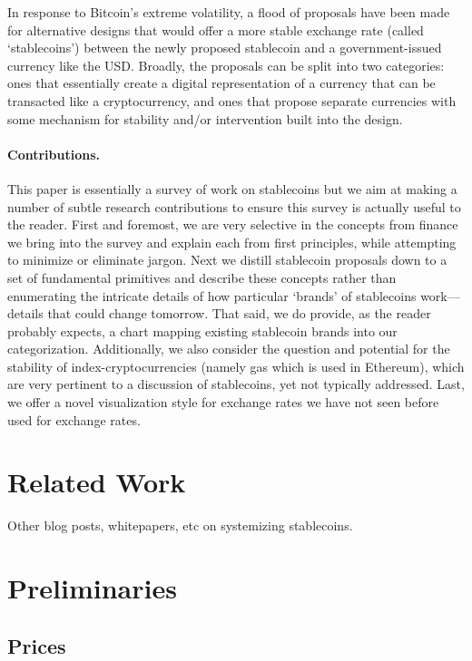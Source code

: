 In response to Bitcoin's extreme volatility, a flood of proposals have been made for alternative designs that would offer a more stable exchange rate (called `stablecoins') between the newly proposed stablecoin and a government-issued currency like the USD. Broadly, the proposals can be split into two categories: ones that essentially create a digital representation of a currency that can be transacted like a cryptocurrency, and ones that propose separate currencies with some mechanism for stability and/or intervention built into the design.

\paragraph{Contributions.} This paper is essentially a survey of work on stablecoins but we aim at making a number of subtle research contributions to ensure this survey is actually useful to the reader. First and foremost, we are very selective in the concepts from finance we bring into the survey and explain each from first principles, while attempting to minimize or eliminate jargon. Next we distill stablecoin proposals down to a set of fundamental primitives and describe these concepts rather than enumerating the intricate details of how particular `brands' of stablecoins work---details that could change tomorrow. That said, we do provide, as the reader probably expects, a chart mapping existing stablecoin brands into our categorization. Additionally, we also consider the question and potential for the stability of  index-cryptocurrencies (namely gas which is used in Ethereum), which are very pertinent to a discussion of stablecoins, yet not typically addressed. Last, we offer a novel visualization style for exchange rates we have not seen before used for exchange rates. 

\section{Related Work}

Other blog posts, whitepapers, etc on systemizing stablecoins. 



\section{Preliminaries}

\subsection{Prices}

